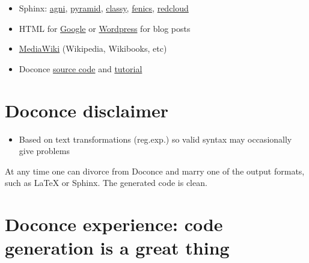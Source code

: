 \documentclass[%
twoside,                 %
draft,                   %
final,                   %
chapterprefix=true,      %
open=right               %
10pt]{book}
\newcounter{doconce:movie:counter}
\newenvironment{graybox1admon}[1][]{
\begin{graybox1mdframed}[frametitle=#1]
}
{
\end{graybox1mdframed}
}
\newcounter{doconce:exercise:counter}
\begin{document}
\begin{shadedquoteBlue}
\begin{itemize}
 \item Sphinx: \href{{http://hplgit.github.com/teamods/writing_reports/_static/sphinx-agni/index.html}}{agni}, \href{{http://hplgit.github.com/teamods/writing_reports/_static/sphinx-pyramid/report.html}}{pyramid}, \href{{http://hplgit.github.com/teamods/writing_reports/_static/sphinx-classy/report.html}}{classy}, \href{{http://hplgit.github.com/teamods/writing_reports/_static/sphinx-fenics_minimal/report.html}}{fenics}, \href{{http://hplgit.github.com/teamods/writing_reports/_static/sphinx-redcloud/report.html}}{redcloud}

 \item HTML for \href{{http://doconce-report-demo.blogspot.no/}}{Google} or \href{{http://doconcereportdemo.wordpress.com/}}{Wordpress} for blog posts

 \item \href{{http://doconcedemo.shoutwiki.com/wiki/Doconce_demo_page}}{MediaWiki} (Wikipedia, Wikibooks, etc)

 \item Doconce \href{{http://hplgit.github.com/teamods/writing_reports/_static/report.do.txt.html}}{source code} and \href{{http://hplgit.github.io/doconce/doc/pub/tutorial/html/index.html}}{tutorial}
\end{itemize}

\noindent
\section*{Doconce disclaimer}

\begin{itemize}
 \item Based on text transformations (reg.exp.) so valid syntax may
   occasionally give problems
\end{itemize}

\noindent

\begin{graybox1admon}[Doconce divorce.]
At any time one can divorce from Doconce and marry one of the output
formats, such as {\LaTeX} or Sphinx. The generated code is clean.
\end{graybox1admon}



\section*{Doconce experience: code generation is a great thing}



\end{shadedquoteBlue}
\end{document}

